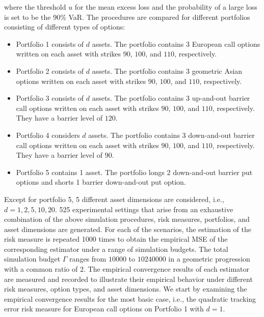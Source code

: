 where the threshold $u$ for the mean excess loss and the probability of a large loss is set to be the 90\% VaR.
The procedures are compared for different portfolios consisting of different types of options:
\begin{itemize}
    \item   Portfolio 1 consists of $d$ assets.
    The portfolio contains 3 European call options written on each asset with strikes $90$, $100$, and $110$, respectively. 
    \item   Portfolio 2 consists of $d$ assets.
    The portfolio contains 3 geometric Asian options written on each asset with strikes $90$, $100$, and $110$, respectively. 
    \item   Portfolio 3 consists of $d$ assets.
    The portfolio contains 3 up-and-out barrier call options written on each asset with strikes $90$, $100$, and $110$, respectively. They have a barrier level of $120$.
    \item   Portfolio 4 considers $d$ assets.
    The portfolio contains 3 down-and-out barrier call options written on each asset with strikes $90$, $100$, and $110$, respectively. They have a barrier level of $90$.
    \item   Portfolio 5 contains 1 asset.
    The portfolio longs 2 down-and-out barrier put options and shorts 1 barrier down-and-out put option. 
\end{itemize}
Except for portfolio 5, 5 different asset dimensions are considered, i.e., $d = 1, 2, 5, 10, 20$.
525 experimental settings that arise from an exhaustive combination of the above simulation procedures, risk measures, portfolios, and asset dimensions are generated.
For each of the scenarios, the estimation of the risk measure is repeated \num{1000} times to obtain the empirical MSE of the corresponding estimator under a range of simulation budgets.
The total simulation budget $\Gamma$ ranges from $\num{10000}$ to $\num{10240000}$ in a geometric progression with a common ratio of $2$.
The empirical convergence results of each estimator are measured and recorded to illustrate their empirical behavior under different risk measures, option types, and asset dimensions.
We start by examining the empirical convergence results for the most basic case, i.e., the quadratic tracking error risk measure for European call options on Portfolio 1 with $d = 1$.

